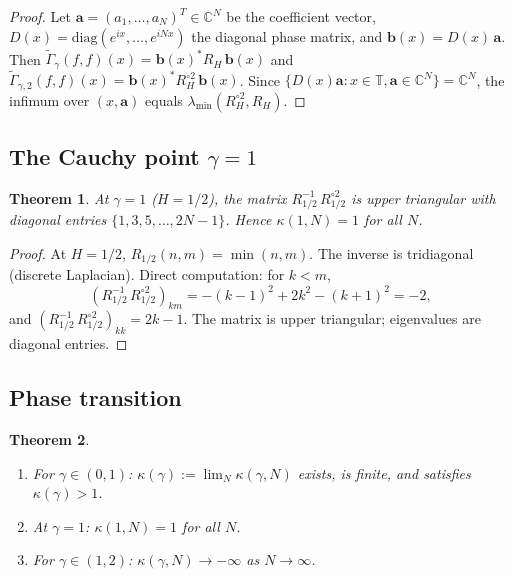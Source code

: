 \documentclass[11pt,a4paper]{article}
\theoremstyle{plain}
\newtheorem{theorem}{Theorem}[section]
\theoremstyle{definition}
\theoremstyle{remark}
\newcommand{\C}{\mathbb{C}}
\newcommand{\T}{\mathbb{T}}
\begin{document}
\begin{proof}
Let $\mathbf{a} = (a_1,\ldots,a_N)^T \in \C^N$ be the coefficient vector,
$D(x) = \mathrm{diag}(e^{ix},\ldots,e^{iNx})$ the diagonal phase matrix,
and $\mathbf{b}(x) = D(x)\,\mathbf{a}$. Then
$\widetilde{\Gamma}_\gamma(f,f)(x) = \mathbf{b}(x)^* R_H\,\mathbf{b}(x)$
and $\widetilde{\Gamma}_{\gamma,2}(f,f)(x) =
\mathbf{b}(x)^* R_H^{\circ 2}\,\mathbf{b}(x)$.
Since $\{D(x)\mathbf{a} : x \in \T, \mathbf{a} \in \C^N\} = \C^N$,
the infimum over $(x,\mathbf{a})$ equals
$\lambda_{\min}(R_H^{\circ 2}, R_H)$.
\end{proof}


\subsection{The Cauchy point $\gamma = 1$}\label{sec:cauchy}

\begin{theorem}\label{thm:cauchy}
At $\gamma = 1$ ($H = 1/2$), the matrix $R_{1/2}^{-1}\,R_{1/2}^{\circ 2}$
is upper triangular with diagonal entries $\{1, 3, 5, \ldots, 2N-1\}$.
Hence $\kappa(1,N) = 1$ for all $N$.
\end{theorem}

\begin{proof}
At $H=1/2$, $R_{1/2}(n,m) = \min(n,m)$. The inverse is tridiagonal
(discrete Laplacian). Direct computation: for $k < m$,
\[
  (R_{1/2}^{-1}\,R_{1/2}^{\circ 2})_{km}
  = -(k-1)^2 + 2k^2 - (k+1)^2 = -2,
\]
and $(R_{1/2}^{-1}\,R_{1/2}^{\circ 2})_{kk} = 2k-1$.
The matrix is upper triangular; eigenvalues are diagonal entries.
\end{proof}


\subsection{Phase transition}

\begin{theorem}\label{thm:phase-transition}
\begin{enumerate}[label=(\roman*)]
\item For $\gamma \in (0,1)$: $\kappa(\gamma) := \lim_N \kappa(\gamma,N)$
  exists, is finite, and satisfies $\kappa(\gamma) > 1$.
\item At $\gamma = 1$: $\kappa(1,N) = 1$ for all $N$.
\item For $\gamma \in (1,2)$: $\kappa(\gamma,N) \to -\infty$ as
  $N \to \infty$.
\end{enumerate}
\end{theorem}
\end{document}
